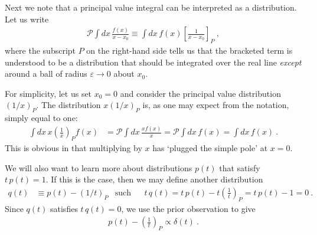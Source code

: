 Next we note that a principal value integral can be interpreted as a distribution. Let us write
\begin{align}
	\mathcal P \int dx\, \frac{f(x)}{x-x_0} \equiv \int dx\, f(x) \left[\frac{1}{x-x_0}\right]_P \ ,
\end{align}
where the subscript $P$ on the right-hand side tells us that the bracketed term is understood to be a distribution that should be integrated over the real line \emph{except} around a ball of radius $\varepsilon\to 0$ about $x_0$. 

For simplicity, let us set $x_0=0$ and consider the principal value distribution $(1/x)_P$. The distribution $x (1/x)_P$ is, as one may expect from the notation, simply equal to one:
\begin{align}
	\int dx\, x\left( \frac{1}{x} \right)_P f(x)
	&= 
	\mathcal P \int dx\, \frac{x f(x)}{x}
	= 
	\mathcal P \int dx\, f(x)
	=
	\int dx\, f(x) \ .
\end{align}
This is obvious in that multiplying by $x$ has `plugged the simple pole' at $x=0$. 

We will also want to learn more about distributions $p(t)$ that satisfy $t\, p(t) = 1$. If this is the case, then we may define another distribution
\begin{align}
	q(t) &\equiv p(t) - (1/t)_P &
	\text{such that}&
	&
	t\,q(t) = t\, p(t) - t\left(\frac{1}{t}\right)_P = t\,p(t) - 1 = 0 \ .
\end{align}
Since $q(t)$ satisfies $t\,q(t)=0$, we use the prior observation to give
\begin{align}
	p(t) - \left(\frac{1}{t}\right)_P \propto \delta(t) \ .
	\label{eq:FT:Dist:PV:Delta}
\end{align}


